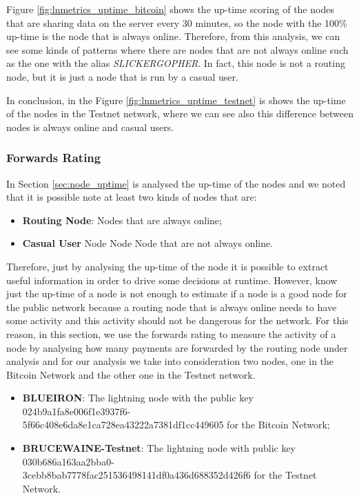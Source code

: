 Figure \ref{fig:lnmetrics_uptime_bitcoin} shows the up-time scoring of the nodes that 
are sharing data on the server every 30 minutes, so the node with the 100\% up-time 
is the node that is always online. Therefore, from this analysis, we can 
see some kinds of patterns where there are nodes that are not always online such as the one 
with the alias \emph{SLICKERGOPHER}. In fact, 
this node is not a routing node, but it is just a node that is run by a casual user.

In conclusion, in the Figure \ref{fig:lnmetrics_uptime_testnet} is
shows the up-time of the nodes in the Testnet network, where we can see also 
this difference between nodes is always online and casual users.

\subsubsection{Forwards Rating}
\label{sec:forwards_rating}

In Section \ref{sec:node_uptime} is analysed the up-time of the nodes and we 
noted that it is possible note at least two kinds of nodes that are: 

\begin{itemize}
    \item {\bf Routing Node}: Nodes that are always online;
    \item {\bf Casual User} Node Node Node that are not always online.
\end{itemize}

Therefore, just by analysing the up-time of the node it is possible to extract useful information 
in order to drive some decisions at runtime. However, know just the 
up-time of a node is not enough to estimate if a node is a good node for the public network 
because a routing node that is always online needs to have some activity and this activity 
should not be dangerous for the network.
For this reason, in this section, we use the forwards rating to measure the activity of a node 
by analysing how many payments are forwarded by the routing node under analysis and for our analysis 
we take into consideration two nodes, one in the Bitcoin Network and the other one in the Testnet network.

\begin{itemize}
    \item {\bf BLUEIRON}: The lightning node with the public key 024b9a1fa8e006f1e3937f6-\\5f66c408e6da8e1ca728ea43222a7381df1cc449605 for the Bitcoin Network;
    \item {\bf BRUCEWAINE-Testnet}: The lightning node with public key 030b686a163aa2bba0-\\3cebb8bab7778fac251536498141df0a436d688352d426f6 for the Testnet Network.
\end{itemize}

